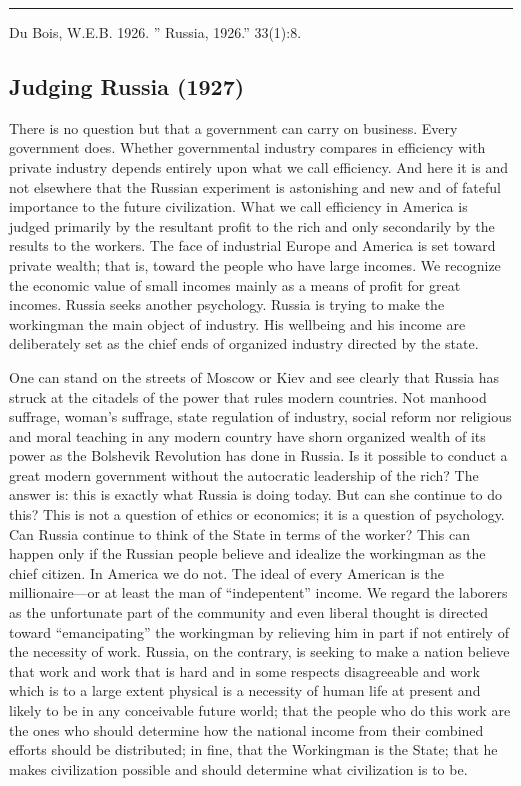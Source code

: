 \documentclass[letterpaper,10pt,english]{jupyterBook}
\begin{document}
\bigskip\hrule\bigskip


\sphinxAtStartPar
{} Du Bois, W.E.B. 1926. ” Russia, 1926.”  33(1):8.


\subsection{Judging Russia (1927)}
\label{\detokenize{Volumes/33/04/judging_russia:judging-russia-1927}}\label{\detokenize{Volumes/33/04/judging_russia::doc}}
\sphinxAtStartPar
There is no question but that a government can carry on business. Every government does. Whether governmental industry compares in efficiency with private industry depends entirely upon what we call efficiency. And here it is and not elsewhere that the Russian experiment is astonishing and new and of fateful importance to the future civilization. What we call efficiency in America is judged primarily by the resultant profit to the rich and only secondarily by the results to the workers. The face of industrial Europe and America is set toward private wealth; that is, toward the people who have large incomes. We recognize the economic value of small incomes mainly as a means of profit for great incomes. Russia seeks another psychology. Russia is trying to make the workingman the main object of industry. His well\sphinxhyphen{}being and his income are deliberately set as the chief ends of organized industry directed by the state.

\sphinxAtStartPar
One can stand on the streets of Moscow or Kiev and see clearly that Russia has struck at the citadels of the power that  rules modern countries. Not manhood suffrage, woman’s suffrage, state regulation of industry, social reform nor religious and moral teaching in any modern country have shorn organized wealth of its power as the Bolshevik Revolution has done in Russia. Is it possible to conduct a great modern government without the autocratic leadership of the rich? The answer is: this is exactly what Russia is doing today. But can she continue to do this? This is not a question of ethics or economics; it is a question of psychology. Can Russia continue to think of the State in terms of the worker? This can happen only if the Russian people believe and idealize the workingman as the chief citizen. In America we do not. The ideal of every American is the millionaire—or at least the man of “indepentent” income. We regard the laborers as the unfortunate part of the community and even liberal thought is directed toward “emancipating” the workingman by relieving him in part if not entirely of the necessity of work. Russia, on the contrary, is seeking to make a nation believe that work and work that is hard and in some respects disagreeable and work which is to a large extent physical is a necessity of human life at present and likely to be in any conceivable future world; that the people who do this work are the ones who should determine how the national income from their combined efforts should be distributed; in fine, that the Workingman is the State; that he makes civilization possible and should determine what civilization is to be.
\end{document}
